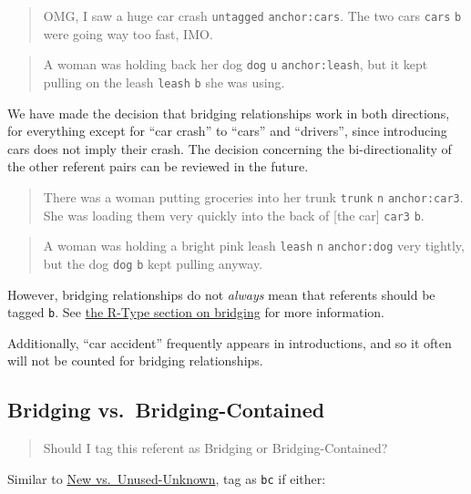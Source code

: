 \documentclass[
]{book}
\begin{document}
\begin{quote}
OMG, I saw a huge car crash \texttt{untagged} \texttt{anchor:cars}.
The two cars \texttt{cars} \texttt{b} were going way too fast, IMO.
\end{quote}

\begin{quote}
A woman was holding back her dog \texttt{dog} \texttt{u} \texttt{anchor:leash},
but it kept pulling on the leash \texttt{leash} \texttt{b} she was using.
\end{quote}

We have made the decision that bridging relationships work in both directions,
for everything except for ``car crash'' to ``cars'' and ``drivers'',
since introducing cars does not imply their crash.
The decision concerning the bi-directionality of the other referent pairs can be reviewed in the future.

\begin{quote}
There was a woman putting groceries into her trunk \texttt{trunk} \texttt{n} \texttt{anchor:car3}.
She was loading them very quickly into the back of {[}the car{]} \texttt{car3} \texttt{b}.
\end{quote}

\begin{quote}
A woman was holding a bright pink leash \texttt{leash} \texttt{n} \texttt{anchor:dog} very tightly,
but the dog \texttt{dog} \texttt{b} kept pulling anyway.
\end{quote}

However, bridging relationships do not \emph{always} mean that
referents should be tagged \texttt{b}.
See \protect\hyperlink{bridging}{the R-Type section on bridging} for more information.

Additionally, ``car accident'' frequently appears in introductions,
and so it often will not be counted for bridging relationships.

\hypertarget{bridging-vs.-bridging-contained}{%
\subsection{Bridging vs.~Bridging-Contained}\label{bridging-vs.-bridging-contained}}

\begin{quote}
Should I tag this referent as Bridging or Bridging-Contained?
\end{quote}

Similar to \protect\hyperlink{new-vs.-unused-unknown}{New vs.~Unused-Unknown},
tag as \texttt{bc} if either:
\end{document}
